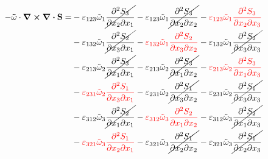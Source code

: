 \begin{equation}
	\begin{split}
 -\mathbf{\tilde{\omega}}\cdot\curl \div \mathbf{S} =&		-\varepsilon_{123}\tilde{\omega}_{1}\cancel{\pdv{S_{3}}{x_{2}}{x_{1}}}
		-\varepsilon_{123}\tilde{\omega}_{1}\cancel{\pdv{S_{3}}{x_{2}}{x_{2}}}
		-{\color{red}\varepsilon_{123}\tilde{\omega}_{1}\pdv{S_{3}}{x_{2}}{x_{3}}}\\
&		-\varepsilon_{132}\tilde{\omega}_{1}\cancel{\pdv{S_{2}}{x_{3}}{x_{1}}}
		-{\color{red}\varepsilon_{132}\tilde{\omega}_{1}\pdv{S_{2}}{x_{3}}{x_{2}}}
		-\varepsilon_{132}\tilde{\omega}_{1}\cancel{\pdv{S_{2}}{x_{3}}{x_{3}}}\\
&		-\varepsilon_{213}\tilde{\omega}_{2}\cancel{\pdv{S_{3}}{x_{1}}{x_{1}}}
		-\varepsilon_{213}\tilde{\omega}_{2}\cancel{\pdv{S_{3}}{x_{1}}{x_{2}}}
		-{\color{red}\varepsilon_{213}\tilde{\omega}_{2}\pdv{S_{3}}{x_{1}}{x_{3}}}\\
&		-{\color{red}\varepsilon_{231}\tilde{\omega}_{2}\pdv{S_{1}}{x_{3}}{x_{1}}}
		-\varepsilon_{231}\tilde{\omega}_{2}\cancel{\pdv{S_{1}}{x_{3}}{x_{2}}}
		-\varepsilon_{231}\tilde{\omega}_{2}\cancel{\pdv{S_{1}}{x_{3}}{x_{3}}}\\
&		-\varepsilon_{312}\tilde{\omega}_{3}\cancel{\pdv{S_{2}}{x_{1}}{x_{1}}}
		-{\color{red}\varepsilon_{312}\tilde{\omega}_{3}\pdv{S_{2}}{x_{1}}{x_{2}}}
		-\varepsilon_{312}\tilde{\omega}_{3}\cancel{\pdv{S_{2}}{x_{1}}{x_{3}}}\\
&		-{\color{red}\varepsilon_{321}\tilde{\omega}_{3}\pdv{S_{1}}{x_{2}}{x_{1}}}
		-\varepsilon_{321}\tilde{\omega}_{3}\cancel{\pdv{S_{1}}{x_{2}}{x_{2}}}
		-\varepsilon_{321}\tilde{\omega}_{3}\cancel{\pdv{S_{1}}{x_{2}}{x_{3}}}\\
	\end{split}
\end{equation}
